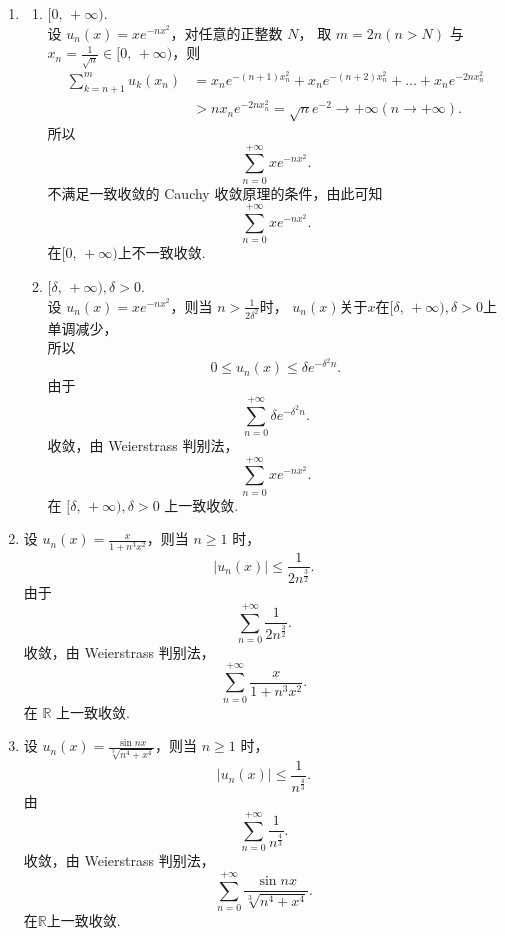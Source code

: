 \begin{enumerate}
\begin{solution}
\begin{enumerate}
        \item 
        \begin{enumerate}
        \item[i.] $[0,\,+\infty).$\\
        设 $\displaystyle u_n(x)=xe^{-nx^2}$，对任意的正整数 $N$，
        取 $m=2n (n>N)$ 与 $\displaystyle x_n=\frac{1}{\sqrt{n}}\in [0,\,+\infty)$，则
        \[
        \begin{aligned}
        \sum_{k=n+1}^{m}u_k(x_n)&=x_ne^{-(n+1)x_n^2}+x_ne^{-(n+2)x_n^2}+...+x_ne^{-2nx_n^2}\\
        &>nx_ne^{-2nx_n^2}=\sqrt{n}e^{-2}\to+\infty(n\to+\infty).
        \end{aligned}
        \] 
        所以
        \[
        \sum_{n=0}^{+\infty}xe^{-nx^2}.
        \]
        不满足一致收敛的 Cauchy 收敛原理的条件，由此可知
        \[
        \sum_{n=0}^{+\infty}xe^{-nx^2}.
        \]
        在$[0,\,+\infty)$上不一致收敛.
        \item[ii.] $[\delta,\,+\infty),\delta>0.$\\
        设 $\displaystyle u_n(x)=xe^{-nx^2}$，则当 $\displaystyle n>\frac{1}{2\delta^2}$时，
        $u_n(x)$关于$x$在$[\delta,\,+\infty),\delta>0$上单调减少，\\
        所以
        \[
        0\leq u_n(x)\leq \delta e^{-\delta^2n}.
        \]
        由于
        \[
        \sum_{n=0}^{+\infty}\delta e^{-\delta^2n}.
        \]
        收敛，由 Weierstrass 判别法，
        \[
        \sum_{n=0}^{+\infty}xe^{-nx^2}.
        \]
        在 $[\delta,\,+\infty),\delta>0$ 上一致收敛.
        \end{enumerate}

        \item 设 $\displaystyle u_n(x)=\frac{x}{1+n^3x^2}$，则当 $n\geq 1$ 时，
        \[
        \left|u_n(x)\right|\leq \frac{1}{2n^{\frac{3}{2}}}.
        \]
        由于
        \[
        \sum_{n=0}^{+\infty}\frac{1}{2n^{\frac{3}{2}}}.
        \]
        收敛，由 Weierstrass 判别法，
        \[
        \sum_{n=0}^{+\infty}\frac{x}{1+n^3x^2}.
        \]
        在 $\mathbb{R}$ 上一致收敛.

        \item 
        设 $\displaystyle u_n(x)=\frac{\sin{nx}}{\sqrt[3]{n^4+x^4}}$，则当 $n\geq 1$ 时，
        \[
        \left|u_n(x)\right|\leq \frac{1}{n^{\frac{4}{3}}}.
        \]
        由
        \[
        \sum_{n=0}^{+\infty}\frac{1}{n^{\frac{4}{3}}}.
        \]
        收敛，由 Weierstrass 判别法，
        \[
        \sum_{n=0}^{+\infty}\frac{\sin{nx}}{\sqrt[3]{n^4+x^4}}.
        \]
        在$\mathbb{R}$上一致收敛.


\end{enumerate}
\end{solution}
\end{enumerate}
